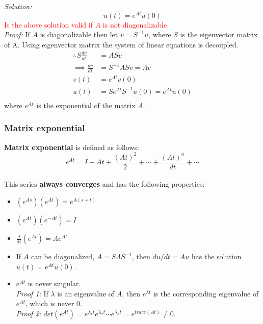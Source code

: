 \textit{Solution:}\\
$$u(t) = e^{At}u(0)$$
\textcolor{red}{Is the above solution valid if $A$ is not diagonalizable.}\\
\textit{Proof:}
If $A$ is diagonalizable then let $v = S^{-1}u$, where $S$ is the eigenvector matrix of A. Using eigenvector matrix the system of linear equations is decoupled.\\ 
\begin{align*}
\therefore S\frac{dv}{dt} &= ASv\\
\implies \frac{dv}{dt} &= S^{-1}ASv = \Lambda v\\
v(t) &= e^{\Lambda t}v(0)\\
u(t) &= Se^{\Lambda t}S^{-1}u(0) = e^{At}u(0)\\
\end{align*}
where $e^{At}$ is the exponential of the matrix $A$.\\




\subsubsection{Matrix exponential}

\textbf{Matrix exponential} is defined as follows:\\
$$e^{At} = I + At + \frac{(At)^{2}}{2} + \cdots + \frac{(At)^n}{dt} + \cdots$$\\

This series \textbf{always converges} and has the following properties:\\
\begin{itemize}
\item $(e^{As})(e^{At}) = e^{A(s+t)}$\\
\item $(e^{At})(e^{-At}) = I$\\
\item $\frac{d}{dt}(e^{At}) = Ae^{At}$
\item If $A$ can be diagonalized, $A = S\Lambda S^{-1}$, then $du/dt = Au$ has the solution $u(t) = e^{At}u(0)$.\\
\item $e^{At}$ is never singular.\\
\textit{Proof 1:} If $\lambda$ is an eigenvalue of $A$, then $e^{\lambda t}$ is the corresponding eigenvalue of $e^{At}$, which is never 0.\\
\textit{Proof 2:} $det(e^{At}) = e^{\lambda_1 t}e^{\lambda_2 t}\cdots e^{\lambda_n t} = e^{trace(At)} \neq 0$.
\end{itemize}


